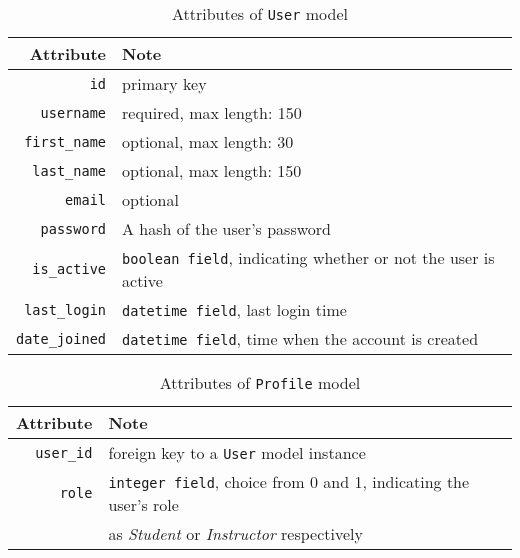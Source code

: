 \begin{table}[ht]
    \centering
    \caption{Attributes of \texttt{User} model}
    \label{tab:USR_ATTR}
    \renewcommand{\arraystretch}{1.3}
    \begin{tabular}[ht]{r|l}
        \hline
        Attribute & Note \\
        \hline
        \hline
        \texttt{id} & primary key \\
        \hline
        \texttt{username} &  required, max length: 150 \\
        \hline
        \texttt{first\_name} &  optional, max length: 30 \\
        \hline
        \texttt{last\_name} &  optional, max length: 150 \\
        \hline
        \texttt{email} & optional\\
        \hline
        \texttt{password} & A hash of the user's password \\
        \hline
        \texttt{is\_active} & \texttt{boolean field}, indicating whether or not the user
            is active \\
        \hline
        \texttt{last\_login} & \texttt{datetime field}, last login time \\
        \hline
        \texttt{date\_joined} & \texttt{datetime field}, time when the account is created \\
        \hline
    \end{tabular}
    \renewcommand{\arraystretch}{1}
\end{table}

\begin{table}[ht]
    \centering
    \caption{Attributes of \texttt{Profile} model}
    \label{tab:PROFILE_ATTR}
    \renewcommand{\arraystretch}{1.3}
    \begin{tabular}[ht]{r|p{4.5in}}
        \hline
        Attribute & Note \\
        \hline
        \hline
        \texttt{user\_id} & foreign key to a \texttt{User} model instance \\
        \hline
        \texttt{role} & \texttt{integer field}, choice from 0 and 1, indicating the
            user's role \\
           & as \emph{Student} or \emph{Instructor} respectively \\
        \hline
    \end{tabular}
    \renewcommand{\arraystretch}{1}
\end{table}


